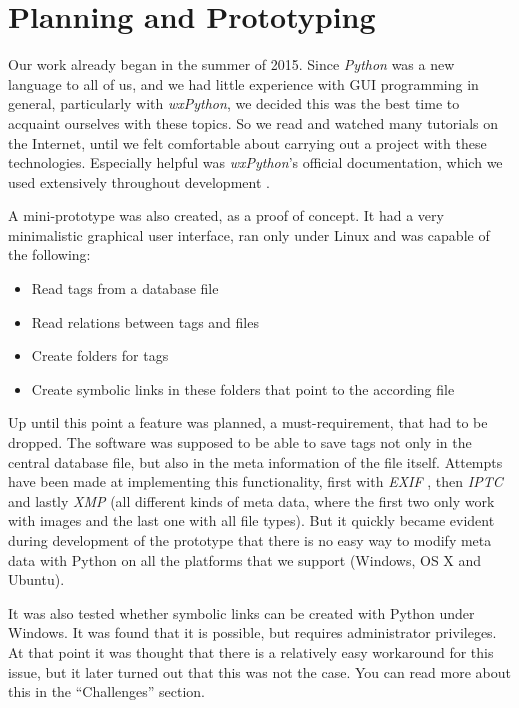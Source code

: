 \section{Planning and Prototyping} %
\def\kapitelautor{Erik Ritschl}

Our work already began in the summer of 2015. Since  \emph{Python} was a new language
to all of us, and we had little experience with GUI programming in general,
particularly with \emph{wxPython}, we decided this was the best time
to acquaint ourselves with these topics. So we read and watched many tutorials
on the Internet, until we felt comfortable about carrying out a project with
these technologies. Especially helpful was \emph{wxPython}'s official documentation, which we used extensively throughout development \cite{wxPythonDoc}.

A mini-prototype was also created, as a proof of concept. It had a very
minimalistic graphical user interface, ran only under Linux and was capable of
the following:

\begin{itemize}
	\item Read tags from a database file
	\item Read relations between tags and files
	\item Create folders for tags
	\item Create symbolic links in these folders that point to the according file
\end{itemize}

Up until this point a feature was planned, a must-requirement, that had to be
dropped. The software was supposed to be able to save tags not only in the
central database file, but also in the meta information of the file itself.
Attempts have been made at implementing this functionality, first with \emph{EXIF} \cite{EXIF},
then \emph{IPTC} \cite{IPTC} and lastly \emph{XMP} \cite{XMP} (all different kinds of meta data, where the first two
only work with images and the last one with all file types). But it quickly became
evident during development of the prototype that there is no easy way to modify
meta data with Python on all the platforms that we support (Windows, OS X and
Ubuntu).

It was also tested whether symbolic links can be created with Python under
Windows. It was found that it is possible, but requires administrator
privileges. At that point it was thought that there is a relatively easy
workaround for this issue, but it later turned out that this was not the case.
You can read more about this in the ``Challenges'' section. %

